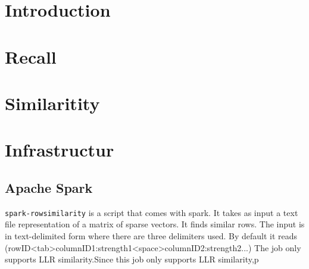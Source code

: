 \documentclass[twoside,a4paper]{article}
\begin{document}
\section{Introduction}
\label{sec:intro}

\section{Recall}
\label{sec:evaluation}

\section{Similaritity}
\label{sec:similarity}



\section{Infrastructur}
\label{sec:infrastructur}


\subsection{Apache Spark}
\label{sec:spark}
\verb|spark-rowsimilarity| is a script that comes with spark. It takes as input a text file representation of a matrix of sparse vectors. It finds similar rows. The input is in text-delimited form where there are three delimiters used. By default it reads (rowID<tab>columnID1:strength1<space>columnID2:strength2...) The job only supports LLR similarity.Since this job only supports LLR similarity,p
\end{document}
